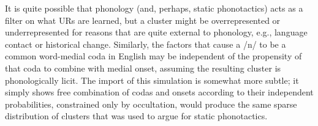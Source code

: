 It is quite possible that phonology (and, perhaps, static phonotactics) acts as a filter on what URs are learned, but a cluster might be overrepresented or underrepresented for reasons that are quite external to phonology, e.g., language contact or historical change. Similarly, the factors that cause a /n/ to be a common word-medial coda in English may be independent of the propensity of that coda to combine with medial onset, assuming the resulting cluster is phonologically licit. The import of this simulation is somewhat more subtle; it simply shows free combination of codas and onsets according to their independent probabilities, constrained only by occultation, would produce the same sparse distribution of clusters that was used to argue for static phonotactics.

